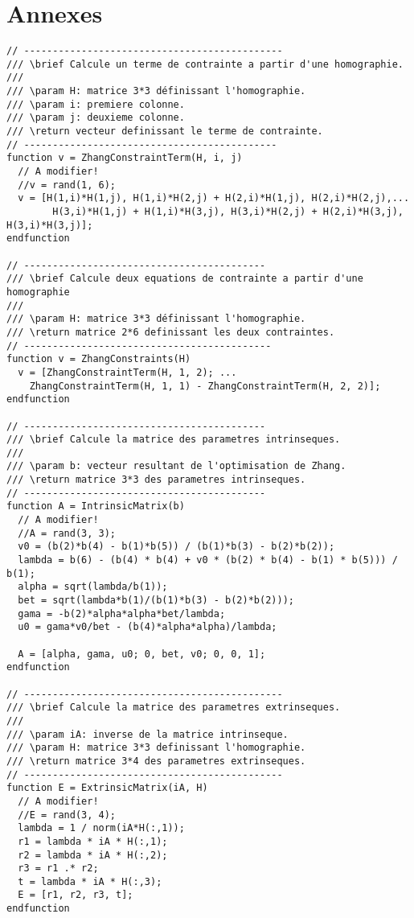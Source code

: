 \documentclass[a4paper,10pt]{article}
\begin{document}
\section{Annexes}
\begin{lstlisting}[caption=Fonctions utilise pour la methode de Zhang]
// ---------------------------------------------
/// \brief Calcule un terme de contrainte a partir d'une homographie.
///
/// \param H: matrice 3*3 définissant l'homographie.
/// \param i: premiere colonne.
/// \param j: deuxieme colonne.
/// \return vecteur definissant le terme de contrainte.
// --------------------------------------------
function v = ZhangConstraintTerm(H, i, j)
  // A modifier!
  //v = rand(1, 6);
  v = [H(1,i)*H(1,j), H(1,i)*H(2,j) + H(2,i)*H(1,j), H(2,i)*H(2,j),...
        H(3,i)*H(1,j) + H(1,i)*H(3,j), H(3,i)*H(2,j) + H(2,i)*H(3,j), H(3,i)*H(3,j)];
endfunction

// ------------------------------------------
/// \brief Calcule deux equations de contrainte a partir d'une homographie
///
/// \param H: matrice 3*3 définissant l'homographie.
/// \return matrice 2*6 definissant les deux contraintes.
// -------------------------------------------
function v = ZhangConstraints(H)
  v = [ZhangConstraintTerm(H, 1, 2); ...
    ZhangConstraintTerm(H, 1, 1) - ZhangConstraintTerm(H, 2, 2)];
endfunction

// ------------------------------------------
/// \brief Calcule la matrice des parametres intrinseques.
///
/// \param b: vecteur resultant de l'optimisation de Zhang.
/// \return matrice 3*3 des parametres intrinseques.
// ------------------------------------------
function A = IntrinsicMatrix(b)
  // A modifier!
  //A = rand(3, 3);
  v0 = (b(2)*b(4) - b(1)*b(5)) / (b(1)*b(3) - b(2)*b(2));
  lambda = b(6) - (b(4) * b(4) + v0 * (b(2) * b(4) - b(1) * b(5))) / b(1);
  alpha = sqrt(lambda/b(1));
  bet = sqrt(lambda*b(1)/(b(1)*b(3) - b(2)*b(2)));
  gama = -b(2)*alpha*alpha*bet/lambda;
  u0 = gama*v0/bet - (b(4)*alpha*alpha)/lambda;
  
  A = [alpha, gama, u0; 0, bet, v0; 0, 0, 1];
endfunction

// ---------------------------------------------
/// \brief Calcule la matrice des parametres extrinseques.
///
/// \param iA: inverse de la matrice intrinseque.
/// \param H: matrice 3*3 definissant l'homographie.
/// \return matrice 3*4 des parametres extrinseques.
// ---------------------------------------------
function E = ExtrinsicMatrix(iA, H)
  // A modifier!
  //E = rand(3, 4);
  lambda = 1 / norm(iA*H(:,1));
  r1 = lambda * iA * H(:,1);
  r2 = lambda * iA * H(:,2);
  r3 = r1 .* r2;
  t = lambda * iA * H(:,3);
  E = [r1, r2, r3, t];
endfunction

\end{lstlisting}
\end{document}
